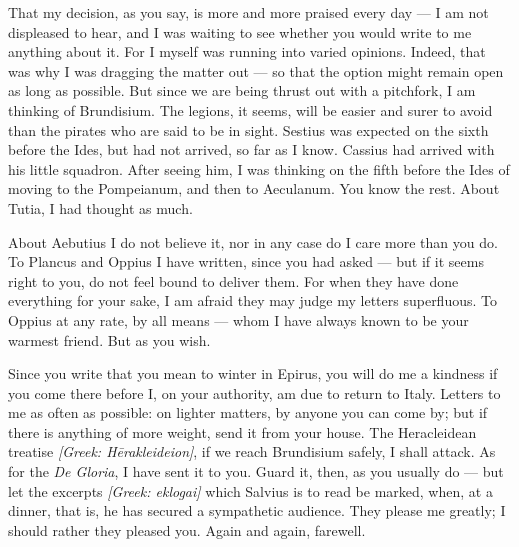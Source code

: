  That my decision, as you say, is more and more praised every day --- I am not displeased to hear, and I was waiting to see whether you would write to me anything about it. For I myself was running into varied opinions. Indeed, that was why I was dragging the matter out --- so that the option might remain open as long as possible. But since we are being thrust out with a pitchfork, I am thinking of Brundisium. The legions, it seems, will be easier and surer to avoid than the pirates who are said to be in sight. Sestius was expected on the sixth before the Ides, but had not arrived, so far as I know. Cassius had arrived with his little squadron. After seeing him, I was thinking on the fifth before the Ides of moving to the Pompeianum, and then to Aeculanum. You know the rest. About Tutia, I had thought as much.

 About Aebutius I do not believe it, nor in any case do I care more than you do. To Plancus and Oppius I have written, since you had asked --- but if it seems right to you, do not feel bound to deliver them. For when they have done everything for your sake, I am afraid they may judge my letters superfluous. To Oppius at any rate, by all means --- whom I have always known to be your warmest friend. But as you wish.

 Since you write that you mean to winter in Epirus, you will do me a kindness if you come there before I, on your authority, am due to return to Italy. Letters to me as often as possible: on lighter matters, by anyone you can come by; but if there is anything of more weight, send it from your house. The Heracleidean treatise \textit{[Greek: H\=erakleideion]}, if we reach Brundisium safely, I shall attack. As for the \textit{De Gloria}, I have sent it to you. Guard it, then, as you usually do --- but let the excerpts \textit{[Greek: eklogai]} which Salvius is to read be marked, when, at a dinner, that is, he has secured a sympathetic audience. They please me greatly; I should rather they pleased you. Again and again, farewell.
